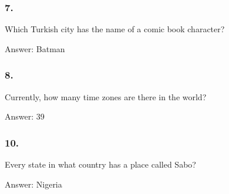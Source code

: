 \documentclass{beamer}
\begin{document}
    \begin{frame}
        \frametitle{7.}
        Which Turkish city has the name of a comic book character?\\

        \begin{center}
            Answer: Batman
        \end{center}
    \end{frame}

    \begin{frame}
        \frametitle{8.}
        Currently, how many time zones are there in the world?\\

        \begin{center}
            Answer: 39
        \end{center}
    \end{frame}

    \begin{frame}
        \frametitle{10.}
        Every state in what country has a place called Sabo?\\

        \begin{center}
            Answer: Nigeria
        \end{center}
    \end{frame}
\end{document}
